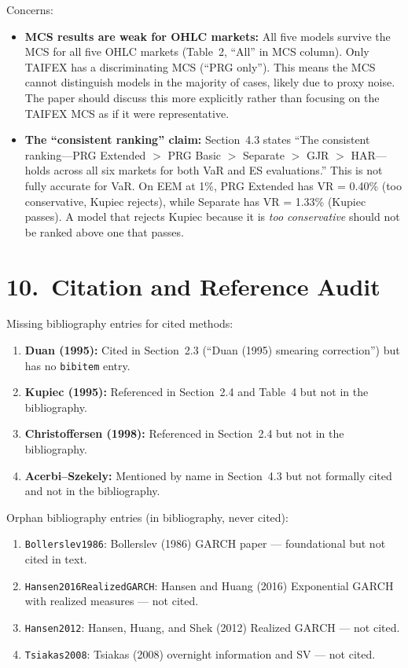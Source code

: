 \documentclass[12pt,a4paper]{article}
\begin{document}
\textcolor{warncolor}{Concerns:}
\begin{itemize}[nosep]
\item \textbf{MCS results are weak for OHLC markets:} All five models survive the MCS for all five OHLC markets (Table~2, ``All'' in MCS column). Only TAIFEX has a discriminating MCS (``PRG only''). This means the MCS cannot distinguish models in the majority of cases, likely due to proxy noise. The paper should discuss this more explicitly rather than focusing on the TAIFEX MCS as if it were representative.
\item \textbf{The ``consistent ranking'' claim:} Section~4.3 states ``The consistent ranking---PRG Extended $>$ PRG Basic $>$ Separate $>$ GJR $>$ HAR---holds across all six markets for both VaR and ES evaluations.'' This is not fully accurate for VaR. On EEM at 1\%, PRG Extended has VR = 0.40\% (too conservative, Kupiec rejects), while Separate has VR = 1.33\% (Kupiec passes). A model that rejects Kupiec because it is \emph{too conservative} should not be ranked above one that passes.
\end{itemize}


\section*{10.\ Citation and Reference Audit}

\textcolor{errorred}{Missing bibliography entries for cited methods:}
\begin{enumerate}[nosep]
\item \textbf{Duan (1995):} Cited in Section~2.3 (``Duan (1995) smearing correction'') but has no \texttt{bibitem} entry.
\item \textbf{Kupiec (1995):} Referenced in Section~2.4 and Table~4 but not in the bibliography.
\item \textbf{Christoffersen (1998):} Referenced in Section~2.4 but not in the bibliography.
\item \textbf{Acerbi--Szekely:} Mentioned by name in Section~4.3 but not formally cited and not in the bibliography.
\end{enumerate}

\textcolor{warncolor}{Orphan bibliography entries (in bibliography, never cited):}
\begin{enumerate}[nosep]
\item \texttt{Bollerslev1986}: Bollerslev (1986) GARCH paper --- foundational but not cited in text.
\item \texttt{Hansen2016RealizedGARCH}: Hansen and Huang (2016) Exponential GARCH with realized measures --- not cited.
\item \texttt{Hansen2012}: Hansen, Huang, and Shek (2012) Realized GARCH --- not cited.
\item \texttt{Tsiakas2008}: Tsiakas (2008) overnight information and SV --- not cited.
\end{enumerate}
\end{document}
